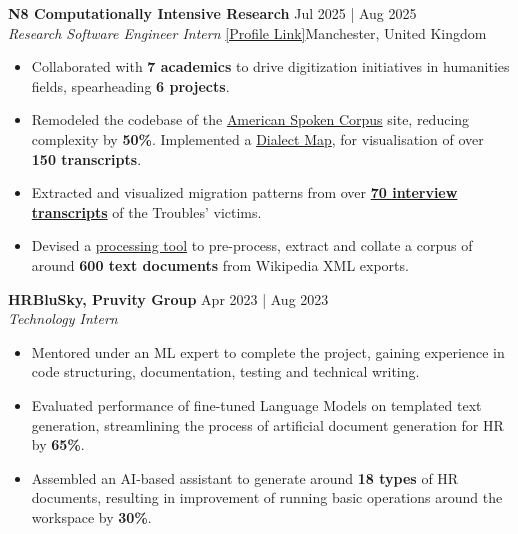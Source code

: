 \documentclass[a4paper]{extarticle}
\begin{document}
\textbf{N8 Computationally Intensive Research} \hfill Jul 2025 | Aug 2025 \\
\textit{Research Software Engineer Intern}
\href{https://n8cir.org.uk/themes/internships/internships-2025/manchester/}{[Profile
Link]}\hfill Manchester, United Kingdom %
\begin{itemize}
  \item Collaborated with \textbf{7 academics} to drive digitization
    initiatives in humanities fields, spearheading \textbf{6 projects}.
  \item Remodeled the codebase of the
    \href{www.spokencorpus.org}{American Spoken Corpus} site,
    reducing complexity by \textbf{50\%}. Implemented a
    \href{https://spokencorpus.org/map_search.php}{Dialect Map}, for
    visualisation of over \textbf{150 transcripts}.
  \item Extracted and visualized migration patterns from over
    \href{https://conflictmemorymigration.manchester.ac.uk/interviews/}{\textbf{70
    interview transcripts}} of the Troubles' victims.
  \item Devised a
    \href{https://github.com/manojmanikandan7/WikipediaXmlParser}{processing
    tool} to pre-process, extract and collate a corpus of around
    \textbf{600 text documents} from Wikipedia XML exports.
\end{itemize}
\textbf{HRBluSky, Pruvity Group} \hfill Apr 2023 | Aug 2023
\\ %
\textit{Technology Intern}  %
\begin{itemize}
  \item Mentored under an ML expert to complete the project, gaining
    experience in code structuring, documentation, testing and
    technical writing.
  \item Evaluated performance of fine-tuned Language Models on
    templated text generation, streamlining the process of artificial
    document generation for HR by \textbf{65\%}.
  \item Assembled an AI-based assistant to generate around \textbf{18
    types} of HR documents, resulting in improvement of running basic
    operations around the workspace by \textbf{30\%}.
\end{itemize}

\end{document}
